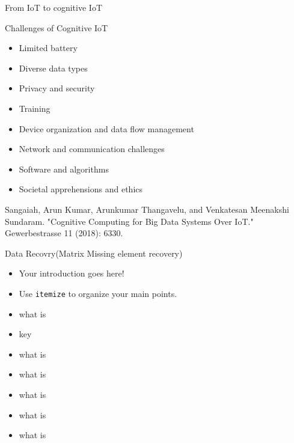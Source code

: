 \documentclass{beamer}
\begin{document}
\begin{frame} {From IoT to cognitive IoT}
   \
   {\Large Challenges of Cognitive IoT\par}
  
  \vskip 1cm
  \begin{itemize}
      \item Limited battery
      \item Diverse data types
      \item Privacy and security
      \item Training
      \item Device organization and data flow management
      \item Network and communication challenges
      \item Software and algorithms
      \item Societal apprehensions and ethics
      
  \end{itemize}
    \vskip 0.5cm
     
   {\tiny Sangaiah, Arun Kumar, Arunkumar Thangavelu, and Venkatesan Meenakshi Sundaram. "Cognitive Computing for Big Data Systems Over IoT." Gewerbestrasse 11 (2018): 6330.\par} 


\end{frame}  

\begin{frame}{Data Recovry(Matrix Missing element recovery)}
\begin{itemize}
  \item Your introduction goes here!
  \item Use \texttt{itemize} to organize your main points.
  \item what is  
  \item key
  \item what is 
  \item what is 
  \item what is 
  \item what is 
  \item what is 

  
\end{itemize}

\vskip 1cm


\end{frame}
\end{document}
